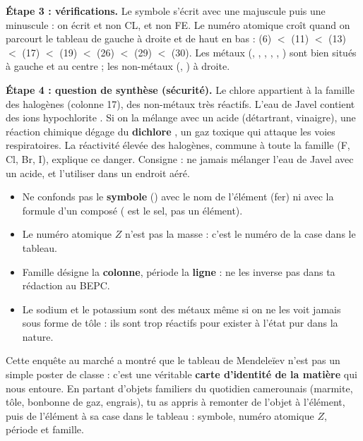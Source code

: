 \documentclass[11pt]{article}
\newcommand{\cle}[1]{{\popxbold\color{popdark}#1}}
\newcounter{popsec}
\newcounter{popsub}
\newcommand{\courssub}[1]{%
  \stepcounter{popsub}%
  \par\vspace{9pt}\noindent{\popxbold\fontsize{11.5}{13}\selectfont\color{popink}{\color{poporange}\thepopsec.\thepopsub}\hspace{6pt}#1}\par\nopagebreak\vspace{4pt}
}
\begin{document}
\begin{exoresolu}
\textbf{Étape 3 : vérifications.} Le symbole s'écrit avec une majuscule puis une minuscule : on écrit  et non CL,  et non FE. Le numéro atomique croît quand on parcourt le tableau de gauche à droite et de haut en bas :  (6) $<$  (11) $<$  (13) $<$  (17) $<$  (19) $<$  (26) $<$  (29) $<$  (30). Les métaux (, , , , , ) sont bien situés à gauche et au centre ; les non-métaux (, ) à droite.

\textbf{Étape 4 : question de synthèse (sécurité).} Le chlore  appartient à la famille des \cle{halogènes} (colonne 17), des non-métaux très réactifs. L'eau de Javel contient des ions hypochlorite . Si on la mélange avec un acide (détartrant, vinaigre), une réaction chimique dégage du \textbf{dichlore} , un gaz toxique qui attaque les voies respiratoires. La réactivité élevée des halogènes, commune à toute la famille (F, Cl, Br, I), explique ce danger. Consigne : ne jamais mélanger l'eau de Javel avec un acide, et l'utiliser dans un endroit aéré.
\end{exoresolu}

\begin{attention}
\begin{itemize}
\item Ne confonds pas le \textbf{symbole} () avec le nom de l'élément (fer) ni avec la formule d'un composé ( est le sel, pas un élément).
\item Le numéro atomique $Z$ n'est pas la masse : c'est le numéro de la case dans le tableau.
\item \og Famille \fg{} désigne la \textbf{colonne}, \og période \fg{} la \textbf{ligne} : ne les inverse pas dans ta rédaction au BEPC.
\item Le sodium  et le potassium  sont des métaux même si on ne les voit jamais sous forme de tôle : ils sont trop réactifs pour exister à l'état pur dans la nature.
\end{itemize}
\end{attention}

\courssub{Bilan de l'activité}

Cette enquête au marché a montré que le tableau de Mendeleïev n'est pas un simple poster de classe : c'est une véritable \textbf{carte d'identité de la matière} qui nous entoure. En partant d'objets familiers du quotidien camerounais (marmite, tôle, bonbonne de gaz, engrais), tu as appris à remonter de l'objet à l'élément, puis de l'élément à sa case dans le tableau : symbole, numéro atomique $Z$, période et famille.
\end{document}
